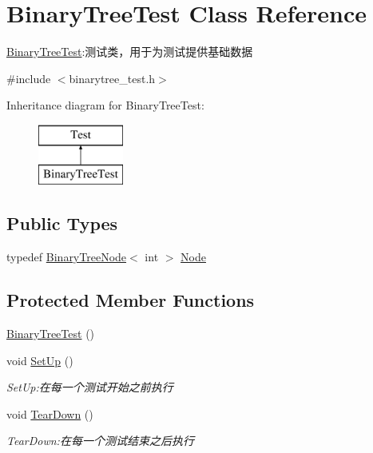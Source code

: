 \hypertarget{class_binary_tree_test}{}\section{Binary\+Tree\+Test Class Reference}
\label{class_binary_tree_test}


\hyperlink{class_binary_tree_test}{Binary\+Tree\+Test}\+:测试类，用于为测试提供基础数据  




{\ttfamily \#include $<$binarytree\+\_\+test.\+h$>$}

Inheritance diagram for Binary\+Tree\+Test\+:\begin{figure}[H]
\begin{center}
\leavevmode
\includegraphics[height=2.000000cm]{class_binary_tree_test}
\end{center}
\end{figure}
\subsection*{Public Types}
\begin{DoxyCompactItemize}
\item 
typedef \hyperlink{struct_introduction_to_algorithm_1_1_tree_algorithm_1_1_binary_tree_node}{Binary\+Tree\+Node}$<$ int $>$ \hyperlink{class_binary_tree_test_ad4aa3d3d01bf0b1b820fffa58e81e15b}{Node}
\end{DoxyCompactItemize}
\subsection*{Protected Member Functions}
\begin{DoxyCompactItemize}
\item 
\hyperlink{class_binary_tree_test_ab650cb6b7b008479f5294b1ed65871e5}{Binary\+Tree\+Test} ()
\item 
void \hyperlink{class_binary_tree_test_ab718ba725e8099dda414f5dbc11e881b}{Set\+Up} ()
\begin{DoxyCompactList}\small\item\em Set\+Up\+:在每一个测试开始之前执行 \end{DoxyCompactList}\item 
void \hyperlink{class_binary_tree_test_ac8daf6a6b88e89733c0ade6da7d4a897}{Tear\+Down} ()
\begin{DoxyCompactList}\small\item\em Tear\+Down\+:在每一个测试结束之后执行 \end{DoxyCompactList}\end{DoxyCompactItemize}
